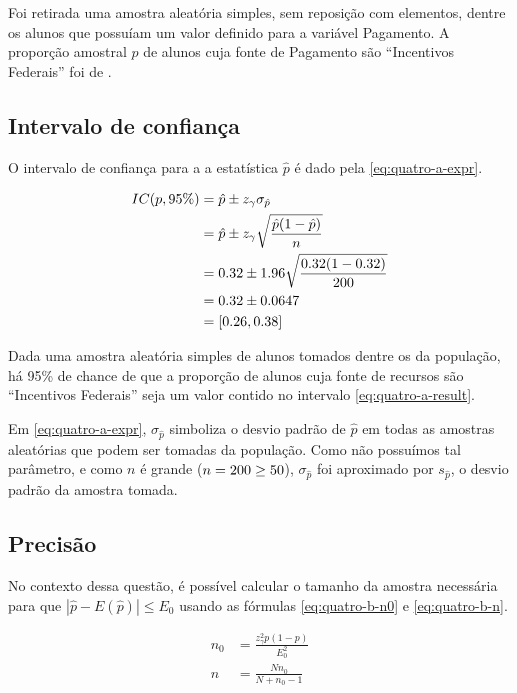 

Foi retirada uma amostra aleatória simples, sem reposição com \QUATROn elementos, dentre os \QUATRON alunos que possuíam um valor definido para a variável Pagamento. A proporção amostral $\hat{p}$ de alunos cuja fonte de Pagamento são ``Incentivos Federais'' foi de \QUATROpAmostral.

\subsection{Intervalo de confiança}
O intervalo de confiança para a a estatística $\hat{p}$ é dado pela \autoref{eq:quatro-a-expr}.

\begin{align} 
	IC(p, 95\%) \label{eq:quatro-a-expr}
	            &= \hat{p} \pm z_\gamma \sigma_{\hat{p}} \\
	            \label{eq:quatro-a-estim}
	            &= \hat{p} \pm z_\gamma \sqrt{\frac{\hat{p}(1-\hat{p})}{n}} \\
	            &= 0.32 \pm 1.96 \sqrt{\frac{0.32 (1- 0.32)}{200}} \nonumber \\
	            &= 0.32 \pm 0.0647 \nonumber \\
	            \label{eq:quatro-a-result}
	            &= [0.26, 0.38]
\end{align}

Dada uma amostra aleatória simples de \QUATROn alunos tomados dentre os \QUATRON da população, há 95\% de chance de que a proporção de alunos cuja fonte de recursos são ``Incentivos Federais'' seja um valor contido no intervalo \eqref{eq:quatro-a-result}.

Em \eqref{eq:quatro-a-expr}, $\sigma_{\hat{p}}$ simboliza o desvio padrão de $\hat{p}$ em todas as amostras aleatórias que podem ser tomadas da população. Como não possuímos tal parâmetro, e como $n$ é grande ($n = 200 \geq 50$), $\sigma_{\hat{p}}$ foi aproximado por $s_{\hat{p}}$, o desvio padrão da amostra tomada.

\subsection{Precisão}
No contexto dessa questão, é possível calcular o tamanho da amostra necessária para que $|\hat{p} - E(\hat{p})| \leq E_0$ usando as fórmulas \eqref{eq:quatro-b-n0} e \eqref{eq:quatro-b-n}.

\begin{align}
	n_0 &= \label{eq:quatro-b-n0}
	       \frac{z_\gamma^2 p(1-p)}{E_0^2} \\
	n &= \label{eq:quatro-b-n}
	     \frac{N n_0}{N + n_0 - 1} 
\end{align}

